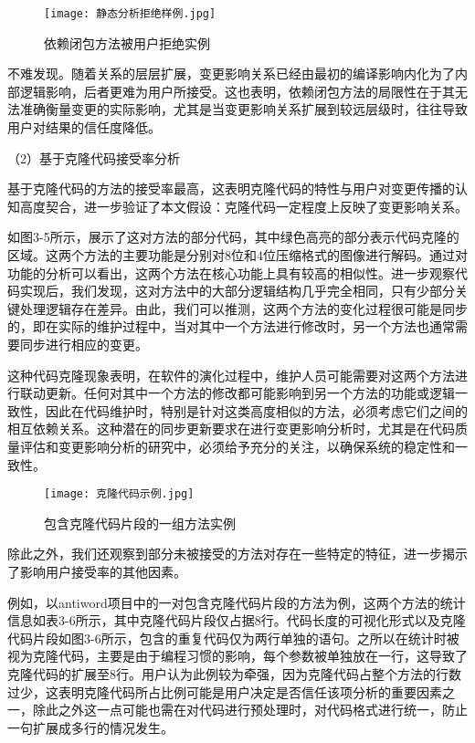 \begin{figure}[h]
\centering
\texttt{[image: 静态分析拒绝样例.jpg]}
\caption{依赖闭包方法被用户拒绝实例}
\end{figure}

不难发现。随着关系的层层扩展，变更影响关系已经由最初的编译影响内化为了内部逻辑影响，后者更难为用户所接受。这也表明，依赖闭包方法的局限性在于其无法准确衡量变更的实际影响，尤其是当变更影响关系扩展到较远层级时，往往导致用户对结果的信任度降低。



（2）基于克隆代码接受率分析

基于克隆代码的方法的接受率最高，这表明克隆代码的特性与用户对变更传播的认知高度契合，进一步验证了本文假设：克隆代码一定程度上反映了变更影响关系。

如图3-5所示，展示了这对方法的部分代码，其中绿色高亮的部分表示代码克隆的区域。这两个方法的主要功能是分别对8位和4位压缩格式的图像进行解码。通过对功能的分析可以看出，这两个方法在核心功能上具有较高的相似性。进一步观察代码实现后，我们发现，这对方法中的大部分逻辑结构几乎完全相同，只有少部分关键处理逻辑存在差异。由此，我们可以推测，这两个方法的变化过程很可能是同步的，即在实际的维护过程中，当对其中一个方法进行修改时，另一个方法也通常需要同步进行相应的变更。

这种代码克隆现象表明，在软件的演化过程中，维护人员可能需要对这两个方法进行联动更新。任何对其中一个方法的修改都可能影响到另一个方法的功能或逻辑一致性，因此在代码维护时，特别是针对这类高度相似的方法，必须考虑它们之间的相互依赖关系。这种潜在的同步更新要求在进行变更影响分析时，尤其是在代码质量评估和变更影响分析的研究中，必须给予充分的关注，以确保系统的稳定性和一致性。

\begin{figure}[h]
\centering
\texttt{[image: 克隆代码示例.jpg]}
\caption{包含克隆代码片段的一组方法实例}
\end{figure}

除此之外，我们还观察到部分未被接受的方法对存在一些特定的特征，进一步揭示了影响用户接受率的其他因素。

例如，以antiword项目中的一对包含克隆代码片段的方法为例，这两个方法的统计信息如表3-6所示，其中克隆代码片段仅占据8行。代码长度的可视化形式以及克隆代码片段如图3-6所示，包含的重复代码仅为两行单独的语句。之所以在统计时被视为克隆代码，主要是由于编程习惯的影响，每个参数被单独放在一行，这导致了克隆代码的扩展至8行。用户认为此例较为牵强，因为克隆代码占整个方法的行数过少，这表明克隆代码所占比例可能是用户决定是否信任该项分析的重要因素之一，除此之外这一点可能也需在对代码进行预处理时，对代码格式进行统一，防止一句扩展成多行的情况发生。

